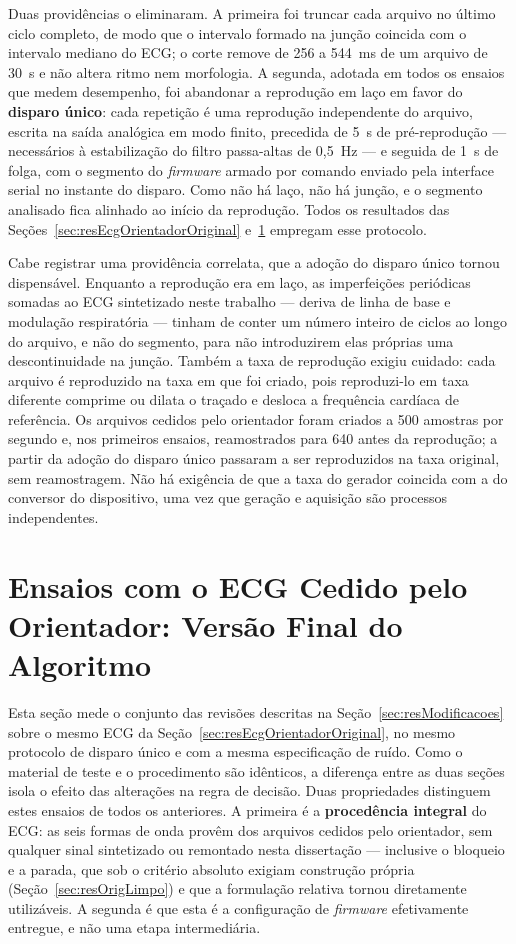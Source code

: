 Duas providências o eliminaram. A primeira foi truncar cada arquivo no último ciclo completo,
de modo que o intervalo formado na junção coincida com o intervalo mediano do \acs{ECG}; o
corte remove de 256 a 544~ms de um arquivo de 30~s e não altera ritmo nem morfologia. A
segunda, adotada em todos os ensaios que medem desempenho, foi abandonar a reprodução em
laço em favor do \textbf{disparo único}: cada repetição é uma reprodução independente do
arquivo, escrita na saída analógica em modo finito, precedida de 5~s de pré-reprodução ---
necessários à estabilização do filtro passa-altas de 0,5~Hz --- e seguida de 1~s de folga,
com o segmento do \textit{firmware} armado por comando enviado pela interface serial no
instante do disparo. Como não há laço, não há junção, e o segmento analisado fica alinhado ao
início da reprodução. Todos os resultados das
Seções~\ref{sec:resEcgOrientadorOriginal} e~\ref{sec:resEcgOrientadorFinal} empregam esse
protocolo.

Cabe registrar uma providência correlata, que a adoção do disparo único tornou dispensável.
Enquanto a reprodução era em laço, as imperfeições periódicas somadas ao \acs{ECG}
sintetizado neste trabalho --- deriva de linha de base e modulação respiratória --- tinham de
conter um número inteiro de ciclos ao longo do arquivo, e não do segmento, para não
introduzirem elas próprias uma descontinuidade na junção. Também a taxa de reprodução exigiu
cuidado: cada arquivo é reproduzido na taxa em que foi criado, pois reproduzi-lo em taxa
diferente comprime ou dilata o traçado e desloca a frequência cardíaca de referência. Os
arquivos cedidos pelo orientador foram criados a 500 amostras por segundo e, nos primeiros
ensaios, reamostrados para 640 antes da reprodução; a partir da adoção do disparo único
passaram a ser reproduzidos na taxa original, sem reamostragem. Não há exigência de que a
taxa do gerador coincida com a do conversor do dispositivo, uma vez que geração e aquisição
são processos independentes.

\section{Ensaios com o ECG Cedido pelo Orientador: Versão Final do Algoritmo}
\label{sec:resEcgOrientadorFinal}

Esta seção mede o conjunto das revisões descritas na Seção~\ref{sec:resModificacoes} sobre o
mesmo \acs{ECG} da Seção~\ref{sec:resEcgOrientadorOriginal}, no mesmo protocolo de disparo
único e com a mesma especificação de ruído. Como o material de teste e o procedimento são
idênticos, a diferença entre as duas seções isola o efeito das alterações na regra de
decisão. Duas propriedades distinguem estes ensaios de todos os anteriores. A primeira é a
\textbf{procedência integral} do \acs{ECG}: as seis formas de onda provêm dos arquivos
cedidos pelo orientador, sem qualquer sinal sintetizado ou remontado nesta dissertação ---
inclusive o bloqueio e a parada, que sob o critério absoluto exigiam construção própria
(Seção~\ref{sec:resOrigLimpo}) e que a formulação relativa tornou diretamente utilizáveis. A
segunda é que esta é a configuração de \textit{firmware} efetivamente entregue, e não uma
etapa intermediária.

